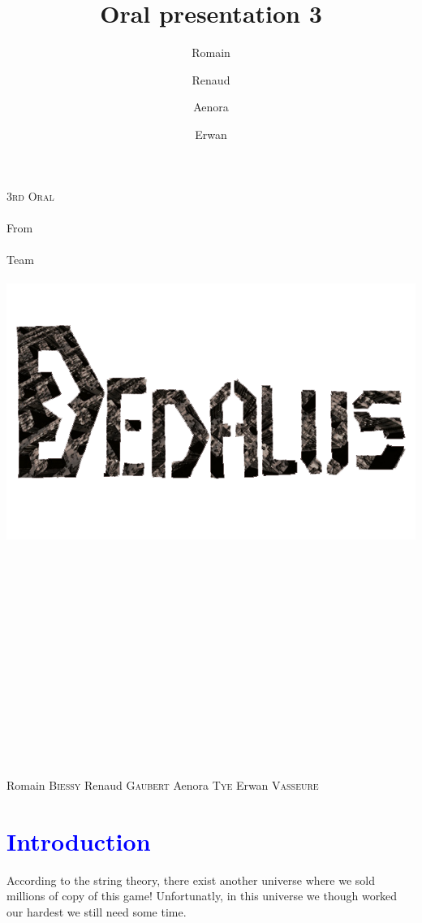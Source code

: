\documentclass[article]{report}             %
\title {Oral presentation 3}
\author {Romain\and Renaud\and Aenora\and Erwan}
\date {}
\begin{document}
	\thispagestyle{empty}
  	\begin{titlepage} 
		\vspace*{1cm} 
  		\begin{center} 
  			{\huge{\textsc{3rd Oral} \\ ~ \\{\large From}\\ ~\\ Team \\  ~ \\ }}
	  		\includegraphics[width = 14cm]{images/Titles/Dedalus.png}
			\\ ~ \\ ~ \\ ~ \\ ~ \\ ~ \\ ~ \\ ~ \\ ~ \\ ~ \\ ~ \\ ~ \\ ~ \\ ~ \\ ~ 
		\end{center}
  		\hfill {\large Romain \textsc{Biessy}}
  		\hfill {\large Renaud \textsc{Gaubert}}
  		\hfill {\large Aenora \textsc{Tye}}
  		\hfill {\large Erwan  \textsc{Vasseure}}
  	\end{titlepage} 

  	\tableofcontents
  		\setcounter{page}{2}
  		\newpage
		\chapter{\textcolor{blue}{Introduction}}
			According to the string theory, there exist another universe where we sold millions of copy of this game! Unfortunatly, in this universe we though worked our hardest we still need some time.\\
\end{document}
